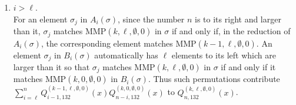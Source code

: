 \documentclass[
final,nomarks
]{dmtcs-episciences}
\newcommand{\Qmmn}[2]{Q_{#2,132}^{(#1)}(x)}
\newcommand{\MMP}{\mathrm{MMP}}
\begin{document}
\begin{enumerate}[{\bf Case }\bf 1.]
\item \begin{math}i > \ell\end{math}. \\
For an element \begin{math}\sigma_j\end{math} 
in \begin{math}A_i(\sigma)\end{math}, since the number \begin{math}n\end{math} is to its right and larger than it, \begin{math}\sigma_j\end{math} matches \begin{math}\MMP(k,\ell,\emptyset,0)\end{math} in \begin{math}\sigma\end{math} 
if and only if, in the reduction of \begin{math}A_i(\sigma)\end{math}, the corresponding element matches \begin{math}\MMP(k-1,\ell,\emptyset,0)\end{math}. An element \begin{math}\sigma_j\end{math} in \begin{math}B_i(\sigma)\end{math} automatically has \begin{math}\ell\end{math} elements to its left which are larger than 
it so that \begin{math}\sigma_j\end{math} matches  
\begin{math}\MMP(k,\ell,\emptyset,0)\end{math} in \begin{math}\sigma\end{math} if and only if it matches \begin{math}\MMP(k,0,\emptyset,0)\end{math} in 
\begin{math}B_i(\sigma)\end{math}. Thus such permutations contribute \begin{math}\sum_{i=\ell}^{n}\Qmmn{k-1,\ell,\emptyset,0}{i-1}\Qmmn{k,0,\emptyset,0}{n-i}\end{math} to \begin{math}\Qmmn{k,\ell,\emptyset,0}{n}\end{math}.
\end{enumerate}
\end{document}
